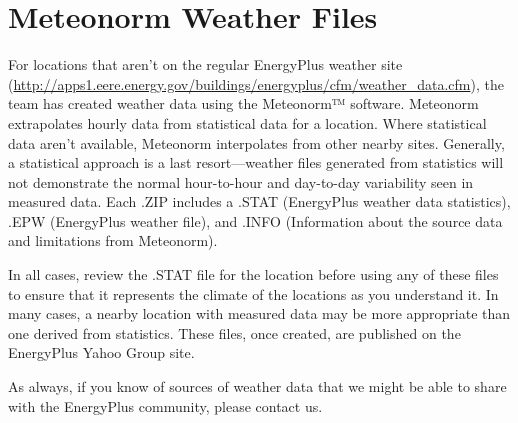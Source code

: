 \section{Meteonorm Weather Files}\label{meteonorm-weather-files}

For locations that aren't on the regular EnergyPlus weather site (\url{http://apps1.eere.energy.gov/buildings/energyplus/cfm/weather_data.cfm}), the team has created weather data using the Meteonorm™ software. Meteonorm extrapolates hourly data from statistical data for a location. Where statistical data aren't available, Meteonorm interpolates from other nearby sites. Generally, a statistical approach is a last resort---weather files generated from statistics will not demonstrate the normal hour-to-hour and day-to-day variability seen in measured data. Each .ZIP includes a .STAT (EnergyPlus weather data statistics), .EPW (EnergyPlus weather file), and .INFO (Information about the source data and limitations from Meteonorm).

In all cases, review the .STAT file for the location before using any of these files to ensure that it represents the climate of the locations as you understand it. In many cases, a nearby location with measured data may be more appropriate than one derived from statistics. These files, once created, are published on the EnergyPlus Yahoo Group site.

As always, if you know of sources of weather data that we might be able to share with the EnergyPlus community, please contact us.
